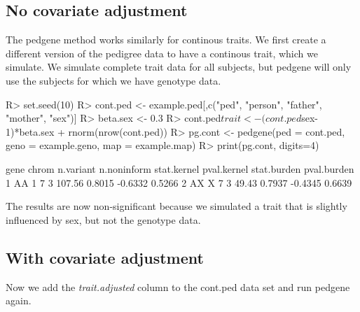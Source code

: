 \documentclass[letterpaper]{article}
\begin{document}
\subsection*{No covariate adjustment}

The pedgene method works similarly for continous traits. We first create a different
version of the pedigree data to have a continous trait, which we simulate.  We simulate 
complete trait data for all subjects, but pedgene will only use the subjects for which we 
have genotype data.

\begin{Schunk}
\begin{Sinput}
R> set.seed(10)
R> cont.ped <- example.ped[,c("ped", "person", "father", "mother", "sex")]
R> beta.sex <- 0.3
R> cont.ped$trait <- (cont.ped$sex-1)*beta.sex + rnorm(nrow(cont.ped))
R> pg.cont <- pedgene(ped = cont.ped, geno = example.geno, map = example.map)
R> print(pg.cont, digits=4)
\end{Sinput}
\begin{Soutput}
  gene chrom n.variant n.noninform stat.kernel pval.kernel stat.burden pval.burden
1   AA     1         7           3      107.56      0.8015     -0.6332      0.5266
2   AX     X         7           3       49.43      0.7937     -0.4345      0.6639
\end{Soutput}
\end{Schunk}

\noindent The results are now non-significant because we simulated
a trait that is slightly influenced by sex, but not the genotype data.

\subsection*{With covariate adjustment}

Now we add the {\sl trait.adjusted} column to the cont.ped data set and run pedgene
again. 
\end{document}
